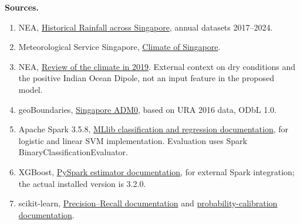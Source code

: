 \documentclass[UTF8,fontset=fandol,10pt,a4paper,landscape]{ctexart}
\begin{document}
\textbf{Sources.}
\begin{enumerate}
\item NEA, \href{https://data.gov.sg/collections/2279/view}{Historical Rainfall across Singapore}, annual datasets 2017--2024.
\item Meteorological Service Singapore, \href{https://www.weather.gov.sg/climate-climate-of-singapore}{Climate of Singapore}.
\item NEA, \href{https://www.nea.gov.sg/media/news/news/index/2019-is-singapore-s-joint-warmest-year-on-record}{Review of the climate in 2019}. External context on dry conditions and the positive Indian Ocean Dipole, not an input feature in the proposed model.
\item geoBoundaries, \href{https://www.geoboundaries.org/api/current/gbOpen/SGP/ADM0/}{Singapore ADM0}, based on URA 2016 data, ODbL 1.0.
\item Apache Spark 3.5.8, \href{https://spark.apache.org/docs/3.5.8/ml-classification-regression.html}{MLlib classification and regression documentation}, for logistic and linear SVM implementation. Evaluation uses Spark BinaryClassificationEvaluator.
\item XGBoost, \href{https://xgboost.readthedocs.io/en/release_3.2.0/tutorials/spark_estimator.html}{PySpark estimator documentation}, for external Spark integration; the actual installed version is 3.2.0.
\item scikit-learn, \href{https://scikit-learn.org/stable/modules/generated/sklearn.metrics.PrecisionRecallDisplay.html}{Precision--Recall documentation} and \href{https://scikit-learn.org/stable/modules/calibration.html}{probability-calibration documentation}.
\end{enumerate}
\end{document}

